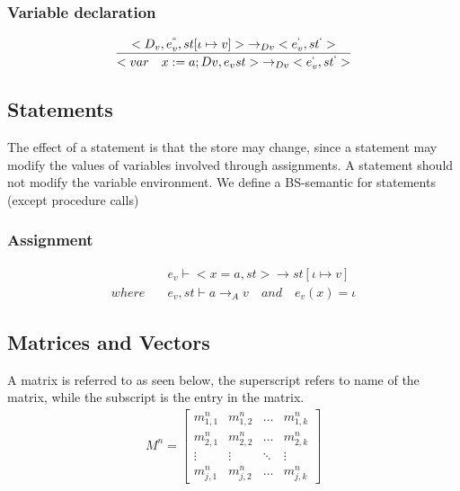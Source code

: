 \subsubsection{Variable declaration}
\begin{equation}
	\frac { <{ D }_{ v },{ e }_{ v }^{ `` },st[\iota \mapsto v]>{ \rightarrow  }_{ Dv }<{ e }_{ v }^{ ` },{ st }^{ ` }> }{ <var\quad x:=a;Dv,{ e }_{ v }st>{ \rightarrow  }_{ Dv }<{ e }_{ v }^{ ` },{ st }^{ ` }> }
\end{equation}

\subsection*{Statements}
The effect of a statement is that the store may change, since a statement may modify the values of variables involved through assignments.
A statement should not modify the variable environment.
We define a BS-semantic for statements (except procedure calls)

\subsubsection{Assignment}
\begin{align*}
	&{ e }_{ v }\vdash <x=a,st>\rightarrow st[\iota \mapsto v]\\
	where\quad &{ e }_{ v },st\vdash a{ \rightarrow  }_{ A }v\quad and\quad  { e }_{ v }(x)=\iota 
\end{align*}

\subsection*{Matrices and Vectors}
A matrix is referred to as seen below, the superscript refers to name of the matrix, while the subscript is the entry in the matrix.
\begin{align*}
	M^{n}= \begin{bmatrix} { { m }_{ 1,1 }^{ n } } & { { m }_{ 1,2 }^{ n } } & \dots  & { m }_{ 1,k }^{ n } \\
{ { m }_{ 2,1 }^{ n } }  &  { { m }_{ 2,2 }^{ n } } & \dots & { m }_{ 2,k }^{ n }
\\ \vdots  & \vdots & \ddots  & \vdots \\
 { m }_{ j,1 }^{ n } & { m }_{ j,2 }^{ n } & \dots & { m }_{ j,k }^{ n } \end{bmatrix}
\end{align*}

